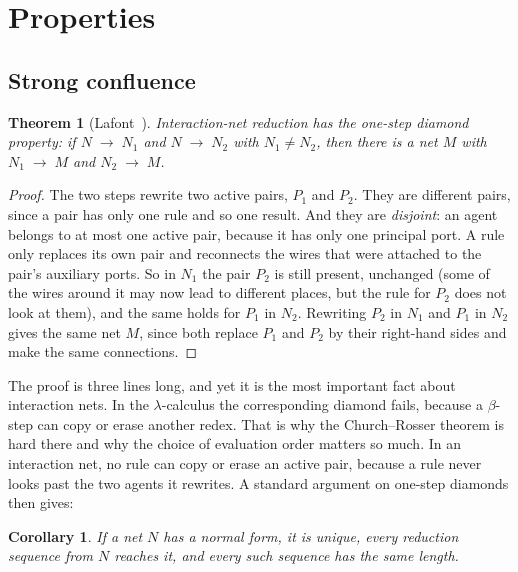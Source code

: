 \documentclass[11pt,a4paper]{article}
\newcommand{\red}{\;\to\;}
\theoremstyle{definition}
\theoremstyle{plain}
\newtheorem{theorem}{Theorem}
\newtheorem{corollary}{Corollary}
\begin{document}
\section{Properties}\label{sec:properties}

\subsection{Strong confluence}

\begin{theorem}[Lafont~\cite{lafont90}]\label{thm:confluence}
Interaction-net reduction has the \emph{one-step diamond property}: if
$N \red N_1$ and $N \red N_2$ with $N_1 \ne N_2$, then there is a net $M$
with $N_1 \red M$ and $N_2 \red M$.
\end{theorem}

\begin{proof}
The two steps rewrite two active pairs, $P_1$ and $P_2$. They are different
pairs, since a pair has only one rule and so one result. And they are
\emph{disjoint}: an agent belongs to at most one active pair, because it has
only one principal port. A rule only replaces its own pair and reconnects the
wires that were attached to the pair's auxiliary ports. So in $N_1$ the pair
$P_2$ is still present, unchanged (some of the wires around it may now lead
to different places, but the rule for $P_2$ does not look at them), and the
same holds for $P_1$ in $N_2$. Rewriting $P_2$ in $N_1$ and $P_1$ in $N_2$
gives the same net $M$, since both replace $P_1$ and $P_2$ by their
right-hand sides and make the same connections.
\end{proof}

\noindent
The proof is three lines long, and yet it is the most important fact about
interaction nets. In the $\lambda$-calculus the corresponding diamond fails,
because a $\beta$-step can copy or erase another redex. That is why the
Church--Rosser theorem is hard there and why the choice of evaluation order
matters so much. In an interaction net, no rule can copy or erase an active
pair, because a rule never looks past the two agents it rewrites. A standard
argument on one-step diamonds then gives:

\begin{corollary}\label{cor:length}
If a net $N$ has a normal form, it is unique, every reduction sequence from
$N$ reaches it, and every such sequence has the same length.
\end{corollary}
\end{document}
